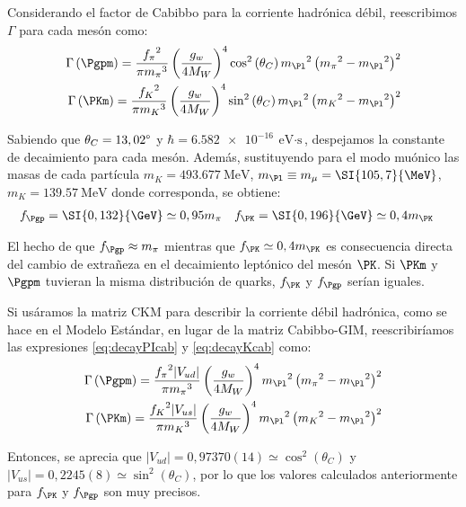 Considerando el factor de Cabibbo para la corriente hadrónica débil, reescribimos $\Gamma$ para cada mesón como:
\begin{align}
\Gamma\left(\Pgpm \right) =\dfrac{{f_{\pi}}^{2}}{\pi {m_{\pi}}^{3}}\left( \dfrac{g_w}{4M_W}\right)^{4} \cos^{2} \left(\theta_{C}\right)  {m_{\Pl}}^{2}\left({m_{\pi}}^{2}-{m_{\Pl}}^{2}\right)^{2}\label{eq:decayPIcab} \\
\Gamma\left(\PKm \right) =\dfrac{{f_{K}}^{2}}{\pi {m_{K}}^{3}}\left(\dfrac{g_w}{4M_W}\right)^{4} \sin^{2} \left(\theta_{C}\right) {m_{\Pl}}^{2}\left({m_{K}}^{2}-{m_{\Pl}}^{2}\right)^{2}\label{eq:decayKcab}
\end{align}

Sabiendo que $\theta_{C}=13,02\degree$ y $\hbar=\SI{6,582e-16}{\eV\cdot\second}$, despejamos la constante de decaimiento para cada mesón. Además, sustituyendo para el modo muónico las masas de cada partícula $m_{K}=\SI{493,677}{\MeV}$, $m_{\Pl} \equiv m_{\mu}=\SI{105,7}{\MeV}$, $m_{K}=\SI{139,57}{\MeV}$ donde corresponda, se obtiene:
\begin{align}
f_{\Pgp} &= \SI{0,132}{\GeV} \simeq 0,95m_{\pi} & f_{\PK} &= \SI{0,196}{\GeV} \simeq 0,4m_{\PK}
\end{align}

El hecho de que $f_{\Pgp} \approx m_{\pi}$ mientras que $f_{\PK} \simeq 0,4m_{\PK}$  es consecuencia directa del cambio de extrañeza en el decaimiento leptónico del mesón $\PK$. Si $\PKm$ y $\Pgpm$ tuvieran la misma distribución de quarks, $f_{\PK}$ y $f_{\Pgp}$ serían iguales.

Si usáramos la matriz CKM para describir la corriente débil hadrónica, como se hace en el Modelo Estándar, en lugar de la matriz Cabibbo-GIM, reescribiríamos las expresiones \ref{eq:decayPIcab} y \ref{eq:decayKcab} como:
\begin{align}
\Gamma\left(\Pgpm \right) =\dfrac{{f_{\pi}}^{2}|V_{ud}|}{\pi {m_{\pi}}^{3}}\left( \dfrac{g_w}{4M_W}\right)^{4} {m_{\Pl}}^{2}\left({m_{\pi}}^{2}-{m_{\Pl}}^{2}\right)^{2}\label{eq:decayPIckm}\\
\Gamma\left(\PKm \right) =\dfrac{{f_{K}}^{2}|V_{us}|}{\pi {m_{K}}^{3}}\left(\dfrac{g_w}{4M_W}\right)^{4} {m_{\Pl}}^{2}\left({m_{K}}^{2}-{m_{\Pl}}^{2}\right)^{2}\label{eq:decayKckm}
\end{align}

Entonces, se aprecia que $|V_{ud}|= 0,97370(14) \simeq \cos^{2} \left(\theta_{C}\right)$ y $|V_{us}|= 0,2245(8) \simeq \sin^{2} \left(\theta_{C}\right)$, por lo que los valores calculados anteriormente para $f_{\PK}$ y $f_{\Pgp}$ son muy precisos\protect\footnotemark .

